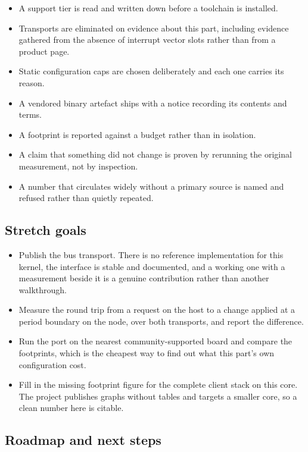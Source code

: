\begin{itemize}
\item A support tier is read and written down before a toolchain is installed.
\item Transports are eliminated on evidence about this part, including evidence
gathered from the absence of interrupt vector slots rather than from a product
page.
\item Static configuration caps are chosen deliberately and each one carries its
reason.
\item A vendored binary artefact ships with a notice recording its contents and
terms.
\item A footprint is reported against a budget rather than in isolation.
\item A claim that something did not change is proven by rerunning the original
measurement, not by inspection.
\item A number that circulates widely without a primary source is named and
refused rather than quietly repeated.
\end{itemize}

\subsection*{Stretch goals}

\begin{itemize}
\item Publish the bus transport. There is no reference implementation for this
kernel, the interface is stable and documented, and a working one with a
measurement beside it is a genuine contribution rather than another walkthrough.
\item Measure the round trip from a request on the host to a change applied at a
period boundary on the node, over both transports, and report the difference.
\item Run the port on the nearest community-supported board and compare the
footprints, which is the cheapest way to find out what this part's own
configuration cost.
\item Fill in the missing footprint figure for the complete client stack on this
core. The project publishes graphs without tables and targets a smaller core,
so a clean number here is citable.
\end{itemize}

\subsection*{Roadmap and next steps}

